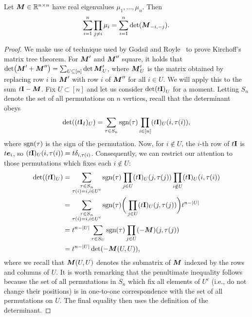 \begin{lemma}
	\label{lem:cofactors_technical}
	Let  ${\vb*{M}}\in\mathbb{R}^{n\times n}$ have real eigenvalues $\mu_1,\dots,\mu_n$. Then 
	\begin{equation}
	\label{eq:cofactors_technical}
	\sum_{i=1}^n \prod_{j\neq i}\mu_i = \sum_{i=1}^n  \det({\vb*{M}}_{-i,-j}).
	\end{equation}
\end{lemma}
\begin{proof}
We make use of technique used by Godsil and Royle~\cite{godsil2013algebraic} to prove Kirchoff's matrix  tree theorem. For ${\vb*{M}}'$ and  ${\vb*{M}}''$  square, it  holds that $\det(\M'+\M'') = \sum_{U\subset[n]} \det \M'_U$, where  ${\vb*{M}}'_U$ is the matrix obtained by replacing row $i$  in ${\vb*{M}}'$ with row   $i$ of ${\vb*{M}}''$  for  all $i\in U$. We will apply  this to the sum $t\vb{I}-{\vb*{M}}$. Fix $U\subset[n]$ and  let  us consider $\det(t\vb{I})_U$ for a moment. Letting $S_n$ denote the set of all permutations on $n$ vertices,  recall  that the determinant obeys  
\begin{equation*}
\det((t\vb{I}_I)_U) = \sum_{\tau\in S_n}\textnormal{sgn}(\tau)\prod_{i\in[n]}(t\vb{I})_U(i,\tau(i)),
\end{equation*}
where $\textnormal{sgn}(\tau)$ is the  sign  of the permutation. Now,  for  $i\notin  U$, the $i$-th row of $t\vb{I}$ is $t\vb*{e}_i$, so $(t\vb{I})_U(i,\tau(i)) = t\delta_{i,\tau(i)}$. Consequently, we can restrict  our attention to those permutations which fixes each $i\notin U$: 
\begin{align*}
\det((t\I)_U) &= \sum_{\substack{\tau \in S_n\\\tau(i)=i,i\in U^c}} \sgn(\tau) \prod_{j\in U} (t\I)_U(j,\tau(j))\prod_{i\notin U}(t\I)_U(i,\tau(i)) \\
&=  \sum_{\substack{\tau \in S_n\\\tau(i)=i,i\in U^c}} \sgn(\tau) \bigg(\prod_{j\in U} (t\I)_U(j,\tau(j))\bigg)t^{n-|U|} \\
&= t^{n-|U|}\sum_{\tau \in S_{U}} \sgn(\tau) \prod_{j\in U} (-\M)(j,\tau(j)) \\
&= t^{n-|U|} \det(-\M(U,U)),  %
\end{align*}
where we recall that ${\vb*{M}}(U,U)$ denotes the submatrix of ${\vb*{M}}$ indexed by the rows and columns of  $U$. It is worth remarking that the penultimate inequality follows because the  set of all permutations in $S_n$ which fix all elements of $U^c$ (i.e.,  do  not  change their positions) is in  one-to-one correspondence with the set of all permutations on $U$. The final equality then  uses the definition of the determinant. 

\end{proof}
